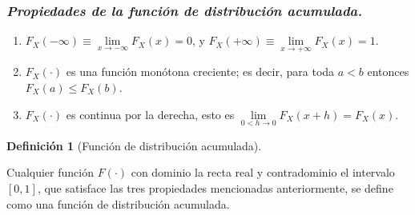 \documentclass[
  us-letterpaper,
]{scrreprt}
\theoremstyle{plain}
\theoremstyle{definition}
\newtheorem{definition}{Definición}[chapter]
\theoremstyle{definition}
\theoremstyle{plain}
\theoremstyle{remark}
\begin{document}
\subsubsection{\texorpdfstring{\textbf{\emph{Propiedades de la función
de distribución
acumulada.}}}{Propiedades de la función de distribución acumulada.}}\label{propiedades-de-la-funciuxf3n-de-distribuciuxf3n-acumulada.}

\begin{enumerate}
\def\labelenumi{\roman{enumi}.}
\item
  \(F_X(-\infty)\equiv \lim\limits_{x\to-\infty} F_X(x)=0\), y
  \(F_X(+\infty)\equiv \lim\limits_{x\to+\infty} F_X(x)=1\).
\item
  \(F_X(\cdot)\) es una función monótona creciente; es decir, para toda
  \(a< b\) entonces \(F_X(a)\leq F_X(b)\).
\item
  \(F_X(\cdot)\) es continua por la derecha, esto es
  \(\lim\limits_{0<h\to 0} F_X(x+h)=F_X(x)\).
\end{enumerate}

\begin{definition}[Función de distribución
acumulada]\protect\hypertarget{def-FDA}{}\label{def-FDA}

Cualquier función \(F(\cdot)\) con dominio la recta real y contradominio
el intervalo \([0,1]\), que satisface las tres propiedades mencionadas
anteriormente, se define como una función de distribución acumulada.

\end{definition}
\end{document}
